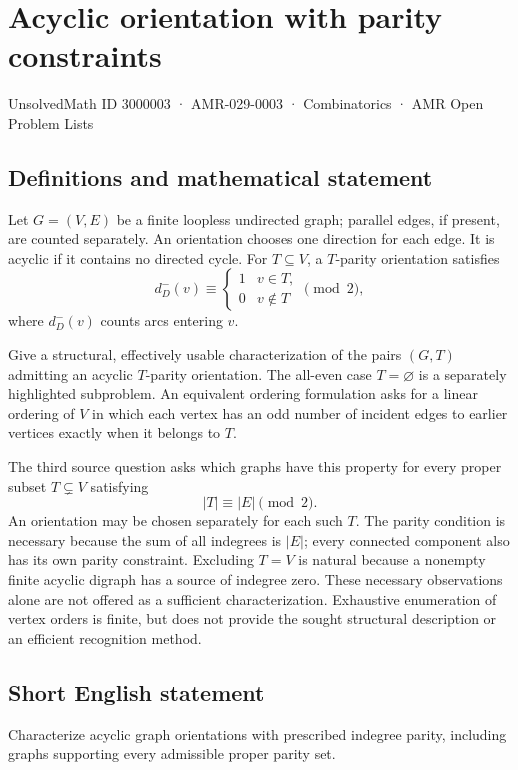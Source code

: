 \documentclass[11pt,a4paper]{article}
\begin{document}
\section*{Acyclic orientation with parity constraints}\label{3000003}
{\small UnsolvedMath ID 3000003 · AMR-029-0003 · Combinatorics · AMR Open Problem Lists}
\subsection{Definitions and mathematical statement}
Let $G=(V,E)$ be a finite loopless undirected graph; parallel edges,
if present, are counted separately. An orientation chooses one direction
for each edge. It is acyclic if it contains no directed cycle.
For $T\subseteq V$, a $T$-parity orientation satisfies
\[
 d_D^-(v)\equiv\begin{cases}1&v\in T,\\0&v\notin T\end{cases}
                       \pmod2,
\]
where $d_D^-(v)$ counts arcs entering $v$.

Give a structural, effectively usable characterization of the pairs
$(G,T)$ admitting an acyclic $T$-parity orientation. The all-even case
$T=\varnothing$ is a separately highlighted subproblem. An equivalent
ordering formulation asks for a linear ordering of $V$ in which each
vertex has an odd number of incident edges to earlier vertices exactly
when it belongs to $T$.

The third source question asks which graphs have this property for
every proper subset $T\subsetneq V$ satisfying
\[
                         |T|\equiv|E|\pmod2.
\]
An orientation may be chosen separately for each such $T$.
The parity condition is necessary because the sum of all indegrees is
$|E|$; every connected component also has its own parity constraint.
Excluding $T=V$ is natural because a nonempty finite acyclic digraph
has a source of indegree zero. These necessary observations alone are
not offered as a sufficient characterization. Exhaustive enumeration
of vertex orders is finite, but does not provide the sought structural
description or an efficient recognition method.
\subsection{Short English statement}
Characterize acyclic graph orientations with prescribed indegree parity, including graphs supporting every admissible proper parity set.
\end{document}
